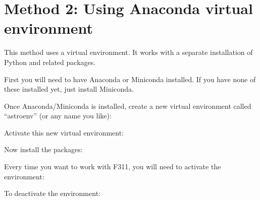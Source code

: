 \documentclass[letterpaper,10pt,english]{sphinxmanual}
\begin{document}
\section{Method 2: Using Anaconda virtual environment}
\label{\detokenize{install:method-2-using-anaconda-virtual-environment}}
This method uses a  virtual environment. It works with a separate installation of Python and related packages.

First you will need to have Anaconda or Miniconda installed. If you have none of these installed yet, just install Miniconda.

Once Anaconda/Miniconda is installed, create a new virtual environment called “astroenv” (or any name you like):

\begin{sphinxVerbatim}[commandchars=\\\{\}]
     
\end{sphinxVerbatim}

Activate this new virtual environment:

\begin{sphinxVerbatim}[commandchars=\\\{\}]
  
\end{sphinxVerbatim}

Now install the packages:

\begin{sphinxVerbatim}[commandchars=\\\{\}]
                
\end{sphinxVerbatim}

 Every time you want to work with F311, you will need to activate the environment:

\begin{sphinxVerbatim}[commandchars=\\\{\}]
  
\end{sphinxVerbatim}

To deactivate the environment:
\end{document}

